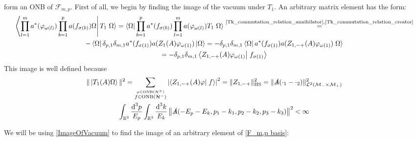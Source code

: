 \documentclass[a4paper,12pt]{article}
\newcommand{\equaltext}[1]{\ensuremath{\stackrel{\text{#1}}{=}}}
\begin{document}
form an ONB of \(\mathcal{F}_{m,p}\).  First of all, we begin by finding the image of the vacuum under \(T_1\). An arbitrary matrix element has the form:
\begin{multline}\label{ImageOfVacuum}
\left<\prod_{l=1}^m a^*(\varphi_{\omega(l)}) \prod_{b=1}^p a(f_{\sigma(b)}) \Omega\right| T_1 \left.\Omega\right>=\left< \Omega\right|  \prod_{b=1}^p a^*(f_{\sigma(b)}) \prod_{l=1}^m a(\varphi_{\omega(l)})T_1 \left.\Omega\right> \equaltext{\eqref{Tk_commutation_relation_annihilator},\eqref{Tk_commutation_relation_creator}} \\
-\left<\Omega\right| \delta_{p,1}\delta_{m,1}a^*(f_{\sigma(1)})a(Z_1(A)\varphi_{\omega(1)})\left|\Omega\right>=-\delta_{p,1}\delta_{m,1}\left<\Omega\right| a^*(f_{\sigma(1)})a(Z_{1,-+}(A)\varphi_{\omega(1)})\left.\Omega\right>\\
=-\delta_{p,1}\delta_{m,1}\left<Z_{1,-+}(A)\varphi_{\omega(1)}\right|\left. f_{\sigma(1)}\right>
\end{multline}
This image is well defined because
 \begin{multline}%
 \| \left| T_1(A)\Omega\right>\|^2=\sum_{\stackrel{\varphi \in \text{ONB}(\mathcal{H}^+)}{f\in \text{ONB}(\mathcal{H}^-)}}\left|\left<Z_{1,-+}(A)\varphi\right|\left. f\right>\right|^2=\| Z_{1,-+}\|_{\text{HS}}^2=\| \slashed{A}(\cdot_1-\cdot_2)\|_{\mathcal{L}^2(\mathcal{M}_- \times\mathcal{M}_+)}^2\\
 \int_{\mathbb{R}^3}\frac{\text{d}^3p}{E_p} \int_{\mathbb{R}^3}\frac{\text{d}^3k}{E_k} \left\| \slashed{A}(-E_p-E_k,p_1-k_1,p_2-k_2,p_3-k_3) \right\|^2<\infty
 \end{multline}

We will be using \eqref{ImageOfVacuum} to find the image of an arbitrary element of \eqref{F_m,p basis}:
\end{document}
